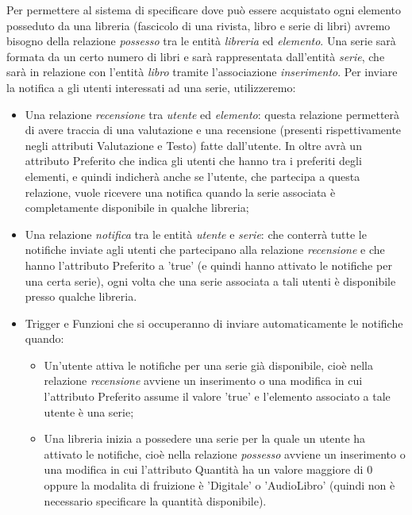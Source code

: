 \documentclass{article}
\begin{document}
Per permettere al sistema di specificare dove può essere acquistato ogni elemento posseduto da una libreria (fascicolo di una rivista, libro e serie di libri) avremo bisogno della relazione \textit{possesso} tra le entità \textit{libreria} ed \textit{elemento}.
Una serie sarà formata da un certo numero di libri e sarà rappresentata dall'entità \textit{serie}, che sarà in relazione con l'entità \textit{libro} tramite l'associazione \textit{inserimento}.
Per inviare la notifica a gli utenti interessati ad una serie, utilizzeremo:
\begin{itemize}
    \item Una relazione \textit{recensione} tra \textit{utente} ed \textit{elemento}: questa relazione permetterà di avere traccia di una valutazione e una recensione (presenti rispettivamente negli attributi Valutazione e Testo) fatte dall'utente. In oltre avrà un attributo Preferito che indica gli utenti che hanno tra i preferiti degli elementi, e quindi indicherà anche se l'utente, che partecipa a questa relazione, vuole ricevere una notifica quando la serie associata è completamente disponibile in qualche libreria;
    \item Una relazione \textit{notifica} tra le entità \textit{utente} e \textit{serie}: che conterrà tutte le notifiche inviate agli utenti che partecipano alla relazione \textit{recensione} e che hanno l'attributo Preferito a 'true' (e quindi hanno attivato le notifiche per una certa serie), ogni volta che una serie associata a tali utenti è disponibile presso qualche libreria.
    \item Trigger e Funzioni che si occuperanno di inviare automaticamente le notifiche quando:
    \begin{itemize}
        \item Un'utente attiva le notifiche per una serie già disponibile, cioè nella relazione \textit{recensione} avviene un inserimento o una modifica in cui l'attributo Preferito assume il valore 'true' e l'elemento associato a tale utente è una serie;
        \item Una libreria inizia a possedere una serie per la quale un utente ha attivato le notifiche, cioè nella relazione \textit{possesso} avviene un inserimento o una modifica in cui l'attributo Quantità ha un valore maggiore di 0 oppure la modalita di fruizione è 'Digitale' o 'AudioLibro' (quindi non è necessario specificare la quantità disponibile).
    \end{itemize} 
\end{itemize}
\end{document}
